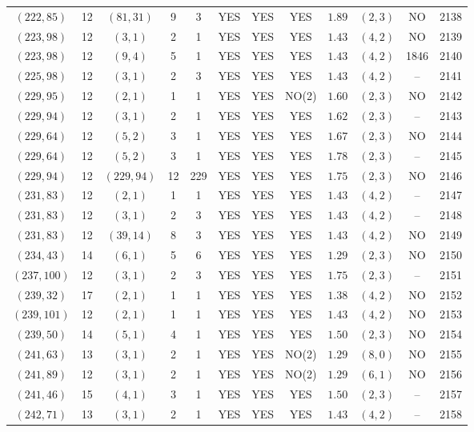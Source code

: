 \begin{longtable}{|c|c|c|c|c|c|c|c|c|c|c|c|}
$(222,85)$ & 12 & $(81,31)$ & 9 & 3 & YES & YES & YES & $1.89$ & $(2,3)$ & NO & 2138\\
$(223,98)$ & 12 & $(3,1)$ & 2 & 1 & YES & YES & YES & $1.43$ & $(4,2)$ & NO & 2139\\
$(223,98)$ & 12 & $(9,4)$ & 5 & 1 & YES & YES & YES & $1.43$ & $(4,2)$ & 1846 & 2140\\
$(225,98)$ & 12 & $(3,1)$ & 2 & 3 & YES & YES & YES & $1.43$ & $(4,2)$ & -- & 2141\\
$(229,95)$ & 12 & $(2,1)$ & 1 & 1 & YES & YES & NO(2) & $1.60$ & $(2,3)$ & NO & 2142\\
$(229,94)$ & 12 & $(3,1)$ & 2 & 1 & YES & YES & YES & $1.62$ & $(2,3)$ & -- & 2143\\
$(229,64)$ & 12 & $(5,2)$ & 3 & 1 & YES & YES & YES & $1.67$ & $(2,3)$ & NO & 2144\\
$(229,64)$ & 12 & $(5,2)$ & 3 & 1 & YES & YES & YES & $1.78$ & $(2,3)$ & -- & 2145\\
$(229,94)$ & 12 & $(229,94)$ & 12 & 229 & YES & YES & YES & $1.75$ & $(2,3)$ & NO & 2146\\
$(231,83)$ & 12 & $(2,1)$ & 1 & 1 & YES & YES & YES & $1.43$ & $(4,2)$ & -- & 2147\\
$(231,83)$ & 12 & $(3,1)$ & 2 & 3 & YES & YES & YES & $1.43$ & $(4,2)$ & -- & 2148\\
$(231,83)$ & 12 & $(39,14)$ & 8 & 3 & YES & YES & YES & $1.43$ & $(4,2)$ & NO & 2149\\
$(234,43)$ & 14 & $(6,1)$ & 5 & 6 & YES & YES & YES & $1.29$ & $(2,3)$ & NO & 2150\\
$(237,100)$ & 12 & $(3,1)$ & 2 & 3 & YES & YES & YES & $1.75$ & $(2,3)$ & -- & 2151\\
$(239,32)$ & 17 & $(2,1)$ & 1 & 1 & YES & YES & YES & $1.38$ & $(4,2)$ & NO & 2152\\
$(239,101)$ & 12 & $(2,1)$ & 1 & 1 & YES & YES & YES & $1.43$ & $(4,2)$ & NO & 2153\\
$(239,50)$ & 14 & $(5,1)$ & 4 & 1 & YES & YES & YES & $1.50$ & $(2,3)$ & NO & 2154\\
$(241,63)$ & 13 & $(3,1)$ & 2 & 1 & YES & YES & NO(2) & $1.29$ & $(8,0)$ & NO & 2155\\
$(241,89)$ & 12 & $(3,1)$ & 2 & 1 & YES & YES & NO(2) & $1.29$ & $(6,1)$ & NO & 2156\\
$(241,46)$ & 15 & $(4,1)$ & 3 & 1 & YES & YES & YES & $1.50$ & $(2,3)$ & -- & 2157\\
$(242,71)$ & 13 & $(3,1)$ & 2 & 1 & YES & YES & YES & $1.43$ & $(4,2)$ & -- & 2158\\

\end{longtable}
